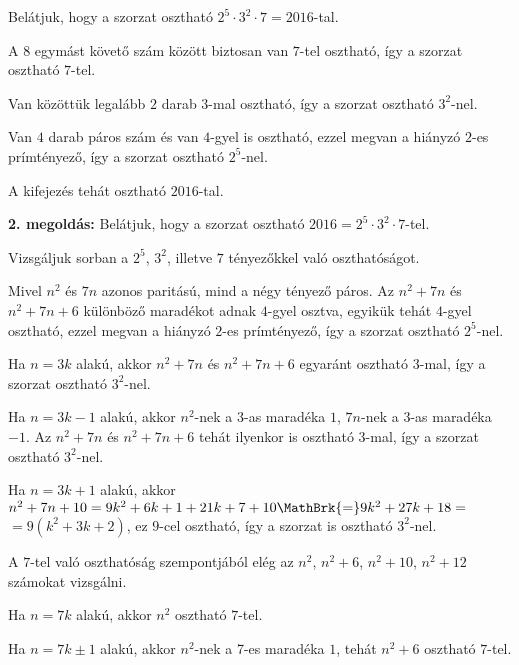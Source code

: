 \documentclass[a4paper,10pt]{article}
\begin{document}
\noindent Belátjuk, hogy a szorzat osztható $2^5\cdot 3^2\cdot7=2016$-tal.

\smallskip

\noindent A $8$ egymást követő szám között biztosan van $7$-tel osztható, így a szorzat osztható $7$-tel. 



\smallskip

\noindent Van közöttük legalább $2$ darab $3$-mal osztható, így a szorzat osztható $3^2$-nel. 


\smallskip

\noindent Van $4$ darab páros szám és van $4$-gyel is osztható, ezzel megvan a hiányzó $2$-es prímtényező, így a szorzat osztható $2^5$-nel. 

\smallskip

\noindent A kifejezés tehát osztható $2016$-tal.

\medskip

{\bf 2. megoldás: } Belátjuk, hogy a szorzat osztható $2016 = 2^5\cdot3^2\cdot7$-tel.

\smallskip

\noindent Vizsgáljuk sorban a $2^5$, $3^2$, illetve $7$ tényezőkkel való oszthatóságot.

\noindent Mivel $n^2$ és $7n$ azonos paritású, mind a négy tényező páros.
Az $n^2+7n$ és $n^2+7n+6$ különböző maradékot adnak $4$-gyel osztva, egyikük tehát $4$-gyel osztható, ezzel megvan a hiányzó $2$-es prímtényező, így a szorzat osztható $2^5$-nel. 

\smallskip

\noindent Ha $n=3k$ alakú, akkor $n^2+7n$ és $n^2+7n+6$ egyaránt osztható $3$-mal, így a szorzat osztható $3^2$-nel.

\noindent Ha  $n=3k-1$ alakú, akkor $n^2$-nek a $3$-as maradéka $1$, $7n$-nek a $3$-as maradéka $-1$. 
Az $n^2+7n$  és $n^2+7n+6$ tehát ilyenkor is osztható $3$-mal, így a szorzat osztható $3^2$-nel.

\noindent Ha $n=3k+1$ alakú, akkor $n^2+7n+10=9k^2+6k+1+21k+7+10\MathBrk{=}9k^2+27k+18=$ $=9(k^2+3k+2)$,
ez $9$-cel osztható, így a szorzat is osztható $3^2$-nel. 

\smallskip

\noindent A $7$-tel való oszthatóság szempontjából elég az $n^2$, $n^2+6$, $n^2+10$, $n^2+12$ számokat vizsgálni.

\noindent Ha  $n=7k$ alakú, akkor $n^2$ osztható $7$-tel.

\noindent Ha $n=7k\pm1$  alakú, akkor $n^2$-nek a 7-es maradéka $1$, tehát $n^2+6$ osztható $7$-tel.
\end{document}
